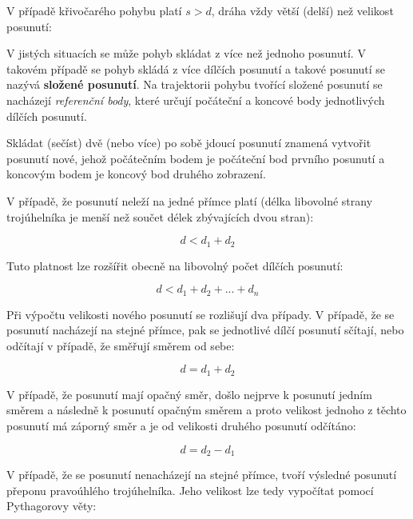 \vskip 4mm
\centerline{}
\vskip 4mm

V případě křivočarého pohybu platí $ s > d $, dráha vždy větší (delší) než velikost posunutí:

\vskip 4mm
\centerline{}
\vskip 4mm


V jistých situacích se může pohyb skládat z více než jednoho posunutí. V takovém případě se pohyb skládá z více dílčích posunutí a takové posunutí se nazývá {\bf složené posunutí}. Na trajektorii pohybu tvořící složené posunutí se nacházejí {\it referenční body}, které určují počáteční a koncové body jednotlivých dílčích posunutí. 

\vskip 4mm
\centerline{}
\vskip 4mm

Skládat (sečíst) dvě (nebo více) po sobě jdoucí posunutí znamená vytvořit posunutí nové, jehož počátečním bodem je počáteční bod prvního posunutí a koncovým bodem je koncový bod druhého zobrazení. 

V případě, že posunutí neleží na jedné přímce platí (délka libovolné strany trojúhelníka je menší než součet délek zbývajících dvou stran):

$$ d < d_1+d_2 $$

Tuto platnost lze rozšířit obecně na libovolný počet dílčích posunutí:

$$ d < d_1+d_2 + ... + d_n$$

Při výpočtu velikosti nového posunutí se rozlišují dva případy. V případě, že se posunutí nacházejí na stejné přímce, pak se jednotlivé dílčí posunutí sčítají, nebo odčítají v případě, že směřují směrem od sebe:

\vskip 4mm
\centerline{}
\vskip 4mm

$$ d = d_1 + d_2 $$

V případě, že posunutí mají opačný směr, došlo nejprve k posunutí jedním směrem a následně k posunutí opačným směrem a proto velikost jednoho z těchto posunutí má záporný směr a je od velikosti druhého posunutí odčítáno:


\vskip 4mm
\centerline{}
\vskip 4mm

$$ d = d_2 - d_1 $$

V případě, že se posunutí nenacházejí na stejné přímce, tvoří výsledné posunutí přeponu pravoúhlého trojúhelníka. Jeho velikost lze tedy vypočítat pomocí Pythagorovy věty:

\vskip 4mm
\centerline{}
\vskip 4mm

